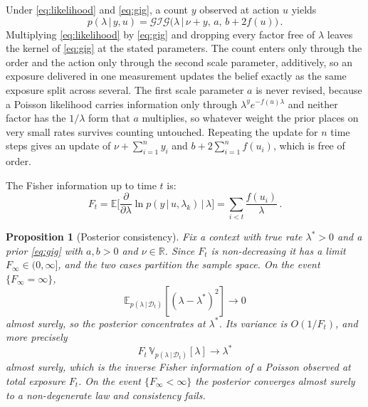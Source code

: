 \documentclass[twoside]{article}
\newcommand\given[1][]{\,#1\vert\,}
\providecommand{\Ex}[2]{\mathbb{E}_{#1}\!\left[#2\right]}
\providecommand{\Var}[2]{\mathbb{V}_{#1}\!\left[#2\right]}
\providecommand{\Gig}{\mathcal{GIG}}  %
\theoremstyle{plain}
\newtheorem{proposition}{Proposition}
\theoremstyle{definition}
\theoremstyle{remark}
\begin{document}
Under \eqref{eq:likelihood} and \eqref{eq:gig}, a count $y$ observed at action $u$ yields
\begin{equation}
    p(\lambda \given y, u) = \Gig\big(\lambda \given \nu + y, \, a, \, b + 2 f(u) \big) \,. \label{eq:posterior}
\end{equation}
Multiplying \eqref{eq:likelihood} by \eqref{eq:gig} and dropping every factor free of $\lambda$ leaves the kernel of \eqref{eq:gig} at the stated parameters.
The count enters only through the order and the action only through the second scale parameter, additively, so an exposure delivered in one measurement updates the belief exactly as the same exposure split across several.
The first scale parameter $a$ is never revised, because a Poisson likelihood carries information only through $\lambda^{y} e^{-f(u) \lambda}$ and neither factor has the $1/\lambda$ form that $a$ multiplies, so whatever weight the prior places on very small rates survives counting untouched. Repeating the update for $n$ time steps gives an update of $\nu + \sum_{i=1}^{n} y_i$ and $b + 2 \sum_{i=1}^{n} f(u_i)$, which is free of order.

The Fisher information up to time $t$ is:
\begin{equation}
	F_t = \mathbb{E} \Big[ \frac{\partial}{\partial \lambda} \ln p(y \given u, \lambda_k) \given \lambda \Big] = \sum_{i < t} \frac{f(u_i)}{\lambda} \, .
\end{equation}

\begin{proposition}[Posterior consistency]
    \label{prop:consistency}
    Fix a context with true rate $\lambda^{*} > 0$ and a prior \eqref{eq:gig} with $a, b > 0$ and $\nu \in \mathbb{R}$.
    Since $F_t$ is non-decreasing it has a limit $F_{\infty} \in (0, \infty]$, and the two cases partition the sample space.
    On the event $\{F_{\infty} = \infty\}$,
    \begin{equation}
        \Ex{p(\lambda \given \mathcal{D}_t)}{(\lambda - \lambda^{*})^{2}} \longrightarrow 0
        \label{eq:consistency}
    \end{equation}
    almost surely, so the posterior concentrates at $\lambda^{*}$.
    Its variance is $O(1/F_t)$, and more precisely
    \begin{equation}
        F_t \, \Var{p(\lambda \given \mathcal{D}_t)}{\lambda} \longrightarrow \lambda^{*}
        \label{eq:consistency_rate}
    \end{equation}
    almost surely, which is the inverse Fisher information of a Poisson observed at total exposure $F_t$.
    On the event $\{F_{\infty} < \infty\}$ the posterior converges almost surely to a non-degenerate law and consistency fails.
\end{proposition}
\end{document}
